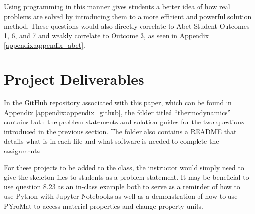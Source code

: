 Using programming in this manner gives students a better idea of how real problems are solved by introducing
them to a more efficient and powerful solution method. These questions would also directly correlate to Abet 
Student Outcomes 1, 6, and 7 and weakly correlate to Outcome 3, as seen in Appendix \ref{appendix:appendix_abet}.

\section{Project Deliverables}

In the GitHub repository associated with this paper, which can be found in Appendix \ref{appendix:appendix_github},
the folder titled ``thermodynamics'' contains both the problem statements and solution guides for the two questions
introduced in the previous section. The folder also contains a README that details what is in each file and 
what software is needed to complete the assignments. 

For these projects to be added to the class, the instructor would simply need to give the skeleton files to 
students as a problem statement. It may be beneficial to use question 8.23 as an in-class example both to serve 
as a reminder of how to use Python with Jupyter Notebooks as well as a demonstration of how to use PYroMat to 
access material properties and change property units.
